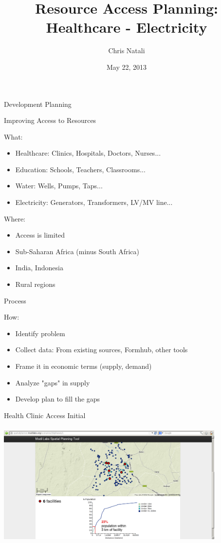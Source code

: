 \documentclass{beamer}
\title{Resource Access Planning:  Healthcare - Electricity}
\author{Chris Natali}
\institute{Modi Labs at Columbia University}
\date{May 22, 2013}
\begin{document}
\begin{frame}{Development Planning}

  Improving Access to Resources

  \bigskip 

  What: 
  \begin{itemize}
  \item[] Healthcare:  Clinics, Hospitals, Doctors, Nurses...
  \item[] Education:  Schools, Teachers, Classrooms...
  \item[] Water:  Wells, Pumps, Taps...
  \item[] Electricity:  Generators, Transformers, LV/MV line...
  \end{itemize}
 
  \bigskip 

  Where: 
  \begin{itemize}
  \item[] Access is limited
  \item[] Sub-Saharan Africa (minus South Africa)
  \item[] India, Indonesia
  \item[] Rural regions
  \end{itemize}


\end{frame}


\begin{frame}{Process}

  How: 
  \begin{itemize}
  \item[] Identify problem
  \item[] Collect data:  From existing sources, Formhub, other tools
  \item[] Frame it in economic terms (supply, demand)
  \item[] Analyze "gaps" in supply 
  \item[] Develop plan to fill the gaps
  \end{itemize}

\end{frame}

\begin{frame}{Health Clinic Access Initial}
  \includegraphics[width=4.5in,height=2.75in]{../diagrams/nigeria-healthcare-initial_6.png}
\end{frame}
\end{document}

